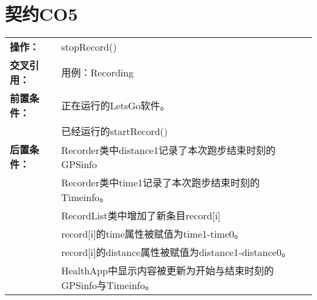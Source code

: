 \documentclass [a4paper,11pt]{article}
\begin{document}
\begin{table}[!hbp]
\section*{契约CO5}
\centering
\begin{tabular*}{\textwidth}{p{}p{}}
\textbf{操作：} & stopRecord()\\
\textbf{交叉引用：} & 用例：Recording\\
\textbf{前置条件：} & 正在运行的LetsGo软件。\\
	&已经运行的startRecord()\\
\textbf{后置条件：} &Recorder类中distance1记录了本次跑步结束时刻的GPSinfo\\
	&Recorder类中time1记录了本次跑步结束时刻的Timeinfo。\\
	&RecordList类中增加了新条目record[i]\\
	&record[i]的time属性被赋值为time1-time0。\\
	&record[i]的distance属性被赋值为distance1-distance0。\\
	&HealthApp中显示内容被更新为开始与结束时刻的GPSinfo与Timeinfo。\\
\end{tabular*}
\end{table}
	

  
\end{document}
